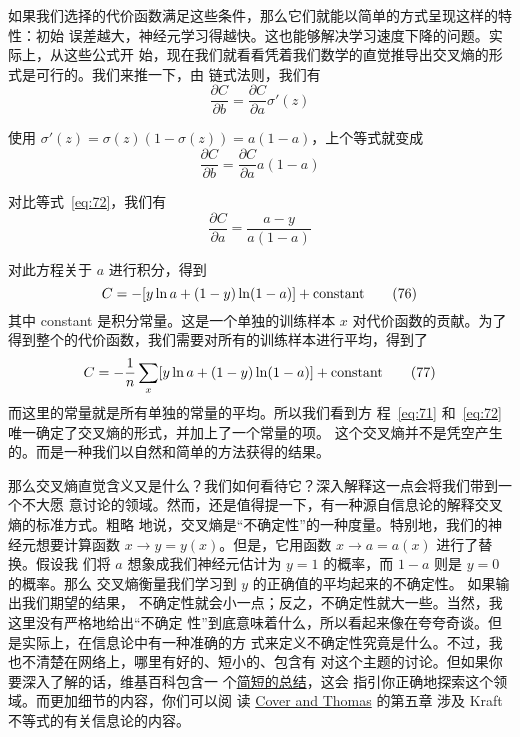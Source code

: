 如果我们选择的代价函数满足这些条件，那么它们就能以简单的方式呈现这样的特性：初始
误差越大，神经元学习得越快。这也能够解决学习速度下降的问题。实际上，从这些公式开
始，现在我们就看看凭着我们数学的直觉推导出交叉熵的形式是可行的。我们来推一下，由
链式法则，我们有
\begin{equation}
  \frac{\partial C}{\partial b} = \frac{\partial C}{\partial a} 
  \sigma'(z)
  \tag{73}
\end{equation}

使用 $\sigma'(z) = \sigma(z)(1-\sigma(z)) = a(1-a)$，上个等式就变成
\begin{equation}
  \frac{\partial C}{\partial b} = \frac{\partial C}{\partial a} 
  a(1-a)
  \label{eq:74}\tag{74}
\end{equation}

对比等式~\eqref{eq:72}，我们有
\begin{equation}
  \frac{\partial C}{\partial a} = \frac{a-y}{a(1-a)}
  \label{eq:75}\tag{75}
\end{equation}

对此方程关于 $a$ 进行积分，得到 
\begin{equation}
  C = -[y \ln a + (1-y) \ln (1-a)]+ {\rm constant}
  \label{eq:76}\tag{76}
\end{equation}
其中 {\rm constant} 是积分常量。这是一个单独的训练样本 $x$ 对代价函数的贡献。为了
得到整个的代价函数，我们需要对所有的训练样本进行平均，得到了
\begin{equation}
  C = -\frac{1}{n} \sum_x [y \ln a +(1-y) \ln(1-a)] + {\rm constant}
  \label{eq:77}\tag{77}
\end{equation}
而这里的常量就是所有单独的常量的平均。所以我们看到方
程~\eqref{eq:71} 和~\eqref{eq:72} 唯一确定了交叉熵的形式，并加上了一个常量的项。
这个交叉熵并不是凭空产生的。而是一种我们以自然和简单的方法获得的结果。

那么交叉熵直觉含义又是什么？我们如何看待它？深入解释这一点会将我们带到一个不大愿
意讨论的领域。然而，还是值得提一下，有一种源自信息论的解释交叉熵的标准方式。粗略
地说，交叉熵是``不确定性''的一种度量。特别地，我们的神经元想要计算函数 $x
\rightarrow y = y(x)$。但是，它用函数 $x \rightarrow a = a(x)$ 进行了替换。假设我
们将 $a$ 想象成我们神经元估计为 $y = 1$ 的概率，而 $1-a$ 则是 $y=0$ 的概率。那么
交叉熵衡量我们学习到 $y$ 的正确值的平均起来的不确定性。 如果输出我们期望的结果，
不确定性就会小一点；反之，不确定性就大一些。当然，我这里没有严格地给出``不确定
性''到底意味着什么，所以看起来像在夸夸奇谈。但是实际上，在信息论中有一种准确的方
式来定义不确定性究竟是什么。不过，我也不清楚在网络上，哪里有好的、短小的、包含有
对这个主题的讨论。但如果你要深入了解的话，维基百科包含一
个\href{http://en.wikipedia.org/wiki/Cross_entropy#Motivation}{简短的总结}，这会
指引你正确地探索这个领域。而更加细节的内容，你们可以阅
读 \href{http://books.google.ca/books?id=VWq5GG6ycxMC}{Cover and Thomas} 的第五章
涉及 Kraft 不等式的有关信息论的内容。

